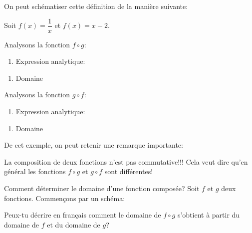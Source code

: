 \documentclass[a4paper,12pt]{report}
\begin{document}
On peut schématiser cette définition de la manière suivante:

\vspace{3cm}

\begin{exemple}
Soit \(f(x)=\dfrac{1}{x}\) et \(f(x)=x-2\).
\par \setlength{\columnseprule}{0 pt}
          \begin{minipage}[t]{\linewidth}
          \begin{multicols}{2}

Analysons la fonction \(f\circ g\):

\begin{enumerate}
\item Expression analytique:
\end{enumerate}
\vspace{1cm}

\begin{enumerate}
\item Domaine
\end{enumerate}


Analysons la fonction \(g\circ f\):

\begin{enumerate}
\item Expression analytique:
\end{enumerate}
\vspace{1cm}

\begin{enumerate}
\item Domaine
\end{enumerate}


\end{multicols}\end{minipage}
\vspace{2cm}
\end{exemple}

De cet exemple, on peut retenir une remarque importante:
\begin{remarque}
La composition de deux fonctions n'est pas commutative!!! Cela veut dire qu'en
général les fonctions \(f\circ g\) et \(g\circ f\) sont différentes!
\end{remarque}

Comment déterminer le domaine d'une fonction composée? Soit \(f\) et \(g\) deux
fonctions. Commençons par un schéma:
\vspace{10cm}

Peux-tu décrire en français comment le domaine de \(f\circ g\) s'obtient à partir
du domaine de \(f\) et du domaine de \(g\)?
\vspace{3cm}
\end{document}
